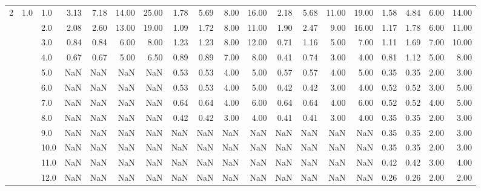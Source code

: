 \begin{tabular}{lllrrrrrrrrrrrrrrrr}
2 & 1.0 & 1.0  &       3.13 &      7.18 & 14.00 &  25.00 &       1.78 &      5.69 &  8.00 &  16.00 &       2.18 &      5.68 & 11.00 &  19.00 &       1.58 &      4.84 & 6.00 &  14.00 \\
     &     & 2.0  &       2.08 &      2.60 & 13.00 &  19.00 &       1.09 &      1.72 &  8.00 &  11.00 &       1.90 &      2.47 &  9.00 &  16.00 &       1.17 &      1.78 & 6.00 &  11.00 \\
     &     & 3.0  &       0.84 &      0.84 &  6.00 &   8.00 &       1.23 &      1.23 &  8.00 &  12.00 &       0.71 &      1.16 &  5.00 &   7.00 &       1.11 &      1.69 & 7.00 &  10.00 \\
     &     & 4.0  &       0.67 &      0.67 &  5.00 &   6.50 &       0.89 &      0.89 &  7.00 &   8.00 &       0.41 &      0.74 &  3.00 &   4.00 &       0.81 &      1.12 & 5.00 &   8.00 \\
     &     & 5.0  &        NaN &       NaN &   NaN &    NaN &       0.53 &      0.53 &  4.00 &   5.00 &       0.57 &      0.57 &  4.00 &   5.00 &       0.35 &      0.35 & 2.00 &   3.00 \\
     &     & 6.0  &        NaN &       NaN &   NaN &    NaN &       0.53 &      0.53 &  4.00 &   5.00 &       0.42 &      0.42 &  3.00 &   4.00 &       0.52 &      0.52 & 3.00 &   5.00 \\
     &     & 7.0  &        NaN &       NaN &   NaN &    NaN &       0.64 &      0.64 &  4.00 &   6.00 &       0.64 &      0.64 &  4.00 &   6.00 &       0.52 &      0.52 & 4.00 &   5.00 \\
     &     & 8.0  &        NaN &       NaN &   NaN &    NaN &       0.42 &      0.42 &  3.00 &   4.00 &       0.41 &      0.41 &  3.00 &   4.00 &       0.35 &      0.35 & 2.00 &   3.00 \\
     &     & 9.0  &        NaN &       NaN &   NaN &    NaN &        NaN &       NaN &   NaN &    NaN &        NaN &       NaN &   NaN &    NaN &       0.35 &      0.35 & 2.00 &   3.00 \\
     &     & 10.0 &        NaN &       NaN &   NaN &    NaN &        NaN &       NaN &   NaN &    NaN &        NaN &       NaN &   NaN &    NaN &       0.35 &      0.35 & 2.00 &   3.00 \\
     &     & 11.0 &        NaN &       NaN &   NaN &    NaN &        NaN &       NaN &   NaN &    NaN &        NaN &       NaN &   NaN &    NaN &       0.42 &      0.42 & 3.00 &   4.00 \\
     &     & 12.0 &        NaN &       NaN &   NaN &    NaN &        NaN &       NaN &   NaN &    NaN &        NaN &       NaN &   NaN &    NaN &       0.26 &      0.26 & 2.00 &   2.00 \\

\end{tabular}
